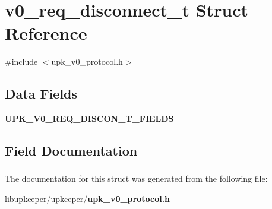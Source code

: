 \section{v0\_\-req\_\-disconnect\_\-t Struct Reference}
\label{structv0__req__disconnect__t}


{\ttfamily \#include $<$upk\_\-v0\_\-protocol.h$>$}

\subsection*{Data Fields}
\begin{DoxyCompactItemize}
\item 
{\bf UPK\_\-V0\_\-REQ\_\-DISCON\_\-T\_\-FIELDS}
\end{DoxyCompactItemize}


\subsection{Field Documentation}
\subsubsection[{UPK\_\-V0\_\-REQ\_\-DISCON\_\-T\_\-FIELDS}]{}\label{structv0__req__disconnect__t_a5adf5ebd9a9d41566f01196da98fe1cd}


The documentation for this struct was generated from the following file:\begin{DoxyCompactItemize}
\item 
libupkeeper/upkeeper/{\bf upk\_\-v0\_\-protocol.h}\end{DoxyCompactItemize}
